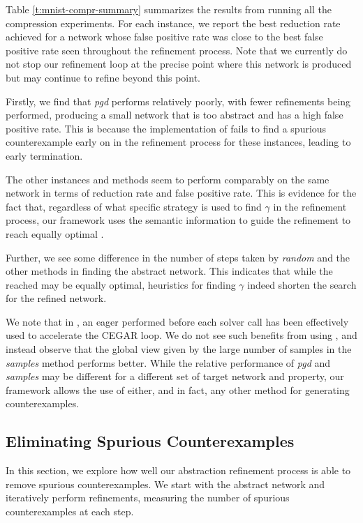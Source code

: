 Table \ref{t:mnist-compr-summary} summarizes the results from running all the
\mnist compression experiments. For each instance, we report the best reduction
rate achieved for a network whose false positive rate was close to the best
false positive rate seen
throughout the refinement process. Note that we currently do not stop our
refinement loop at the precise point where this network is produced but may
continue to refine beyond this point.

Firstly, we find that \textit{pgd} performs relatively poorly, with fewer
refinements being performed, producing a small network that is too abstract and
has a high false positive rate. This is because the \abcrown
implementation of \pgd fails to find a spurious counterexample early on in the
refinement process for these instances, leading to early termination. 

The other instances and methods seem to perform
comparably on the same network in terms of reduction rate and false positive
rate. This is evidence for the fact that, regardless of what specific strategy
is used to find $\gamma$ in the refinement process, our framework uses the
semantic information to guide the refinement to reach equally optimal \abs.

Further, we see some difference in the number of steps taken by \textit{random}
and the other methods in finding the abstract network. This indicates that while
the \abs reached may be equally optimal, heuristics for finding $\gamma$ indeed
shorten the search for the refined network.

We note that in \cite{cleverest-nn}, an eager \pgd performed before each solver
call has been effectively used to accelerate the CEGAR loop. We do not see such
benefits from using \pgd, and instead observe that the global view given by
the large number of samples in the \textit{samples} method performs better.
While the relative performance of \textit{pgd} and \textit{samples} may be
different for a different set of target network and property, our framework
allows the use of either, and in fact, any other method for generating 
counterexamples.

\subsection{Eliminating Spurious Counterexamples}
\label{s:exp-mnist-rob}

In this section, we explore how well our abstraction refinement process is able
to remove spurious counterexamples. We start with the abstract network and
iteratively perform refinements, measuring the number of spurious
counterexamples at each step. 

